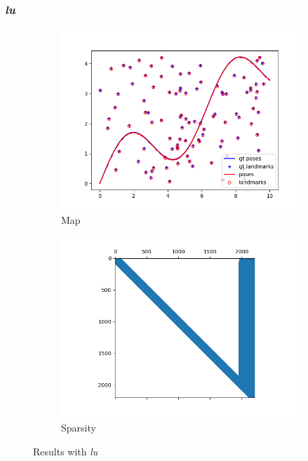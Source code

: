 \documentclass[12pt, a4paper]{article}
\begin{document}
\subsubsection{\textit{lu}}
\begin{figure}[H]
  \centering
  \begin{subfigure}[b]{0.45\textwidth}
    \includegraphics[width=\textwidth]{./results/linear/lu_2d_linear_map.png}
    \caption{Map}
  \end{subfigure}
  \hfill
  \begin{subfigure}[b]{0.45\textwidth}
    \includegraphics[width=\textwidth]{./results/linear/lu_2d_linear_sparsity.png}
    \caption{Sparsity}
  \end{subfigure}
  \caption{Results with \textit{lu}}
\end{figure}
\end{document}
